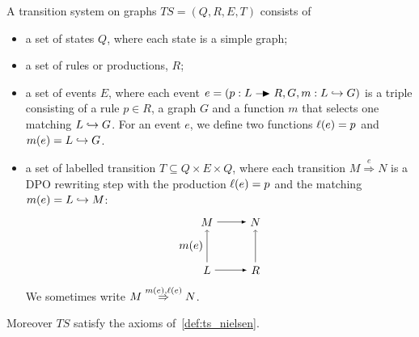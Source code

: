 \begin{definition}[TS on graphs]
  A transition system on graphs $TS = (Q,R,E,T)$ consists of
  \begin{itemize}
  \item a set of states $Q$, where each state is a simple graph;
  \item a set of rules or productions, $R$;
  \item a set of events $E$, where each event $e=(p:L\action R,G,m:L\emb G)$ is a triple consisting of a rule $p\in R$, a graph $G$ and a function $m$ that selects one matching $L\hookrightarrow G$. For an event $e$, we define two functions $\ell(e) = p$ and $m(e) = L\hookrightarrow G$.
  \item a set of labelled transition $T\subseteq Q\times E\times Q$, where each transition $M \overset{e}{\Rightarrow} N$ is a DPO rewriting step with the production $\ell(e) = p$ and the matching $m(e) = L\hookrightarrow M$:
    \[
    \begin{tikzpicture} %
      \node (l) at (-1.5,0) {\(L\)};
      \node (r) at (0,0) {\(R\)};
      \node (m) at (-1.5,1.5) {\(M\)};
      \node (n) at (0,1.5) {\(N\)};
      \draw [->] (l) -- node [left,midway] {\(m(e)\)}  (m);
      \draw [>=latex, ->] (l) -- (r);
      \draw [>=latex, ->] (m) -- (n);
      \draw [->] (r) -- (n);
    \end{tikzpicture}
    \]
    We sometimes write $M\overset{m(e),\ell(e)}{\Rightarrow} N$.
  \end{itemize}
  Moreover $TS$ satisfy the axioms of~\autoref{def:ts_nielsen}.
\end{definition}

